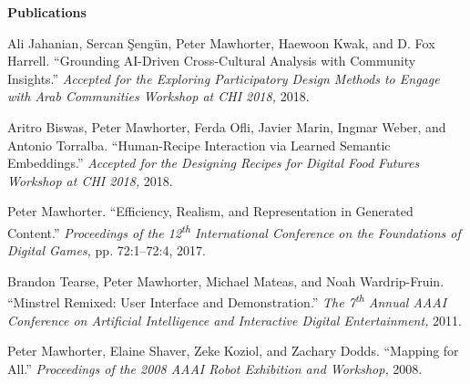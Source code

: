 \documentclass[11pt]{article}
\newenvironment{pubs}[1]{%
  \vspace{8pt}\textbf{\Large #1} \hrulefill\vspace{6pt}
  \begin{adjustwidth}{14pt}{0pt}
  \setlength{\parskip}{4pt}
  \setlength{\parindent}{-8pt}
}{%
  \end{adjustwidth}
}
\newcommand{\fullpub}[5]{%
\begin{samepage}
#1. ``#2.'' \textit{#3,} #4, #5.

\end{samepage}%
}
\newcommand{\nppub}[4]{%
\begin{samepage}
#1. ``#2.'' \textit{#3,} #4.

\end{samepage}%
}
\newcommand{\tsup}[1]{\textsuperscript{#1}}
\begin{document}
\begin{pubs}{Publications}
\nppub{Ali Jahanian, Sercan Şengün, Peter Mawhorter, Haewoon Kwak, and D. Fox Harrell}{Grounding AI-Driven Cross-Cultural Analysis with Community Insights}{Accepted for the Exploring Participatory Design Methods to Engage with Arab Communities Workshop at CHI 2018}{2018}

\nppub{Aritro Biswas, Peter Mawhorter, Ferda Ofli, Javier Marin, Ingmar Weber, and Antonio Torralba}{Human-Recipe Interaction via Learned Semantic Embeddings}{Accepted for the Designing Recipes for Digital Food Futures Workshop at CHI 2018}{2018}

\fullpub{Peter Mawhorter}{Efficiency, Realism, and Representation in Generated Content}{Proceedings of the 12\tsup{th} International Conference on the Foundations of Digital Games}{pp. 72:1--72:4}{2017}

\nppub{Brandon Tearse, Peter Mawhorter, Michael Mateas, and Noah Wardrip-Fruin}{Minstrel Remixed: User Interface and Demonstration}{The 7\tsup{th} Annual AAAI Conference on Artificial Intelligence and Interactive Digital Entertainment}{2011}

\nppub{Peter Mawhorter, Elaine Shaver, Zeke Koziol, and Zachary Dodds}{Mapping for All}{Proceedings of the 2008 AAAI Robot Exhibition and Workshop}{2008}

\end{pubs}
\end{document}
